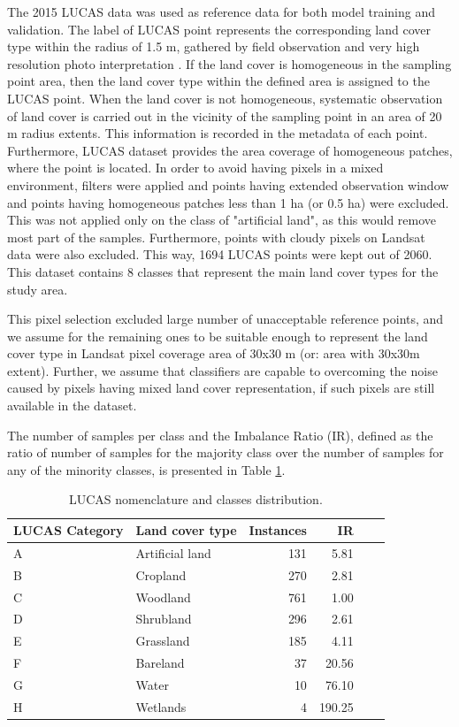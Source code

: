 \documentclass[remotesensing,article,submit,moreauthors,pdftex]{Definitions/mdpi}
\begin{document}
The 2015 LUCAS data was used as reference data for both model training and
validation. The label of LUCAS point represents the corresponding land cover
type within the radius of 1.5 m, gathered  by field observation and very high
resolution photo interpretation  \cite{LUCAS2015C1}. If the land cover is 
homogeneous in the sampling point area, then the land cover type within the 
defined area is assigned to the LUCAS point. When the land cover is not 
homogeneous, systematic observation of land cover is carried out  in the
vicinity of the sampling point in an area of 20 m radius extents. This
information is recorded in the metadata of each point. Furthermore, LUCAS
dataset provides the area coverage of homogeneous patches, where the point is
located. In order to avoid having pixels in a mixed environment, filters were
applied and points having extended observation window and points having
homogeneous patches less than 1 ha (or 0.5 ha)  were excluded. This was not
applied only on the class of "artificial land", as this would remove most part
of the samples. Furthermore, points with cloudy pixels on Landsat data were also
excluded. This way, 1694 LUCAS points were kept out of 2060. This dataset
contains 8 classes that represent the main land cover types for the study area.

This pixel selection excluded large number of unacceptable reference points, and
we assume for the remaining ones to be suitable enough to represent the land
cover type in Landsat pixel coverage area of 30x30 m (or: area with 30x30m 
extent). Further, we assume that classifiers are capable to overcoming the 
noise caused by pixels having mixed land cover representation, if such pixels 
are still available in the dataset.

The number of samples per class and the Imbalance Ratio (IR), defined as the
ratio of number of samples for the majority class over the number of samples for
any of the minority classes, is presented in Table
\ref{tab:classes_distribution}.

\begin{table}[H]
	\centering
	\begin{tabular}{llrrrr}
		\toprule
		\textbf{LUCAS Category} & \textbf{Land cover type} & \textbf{Instances}
		& \textbf{IR} \\
		\hline
		A & Artificial land & 131 & 5.81 \\
		B & Cropland        & 270 & 2.81 \\
		C & Woodland        & 761 & 1.00 \\
		D & Shrubland       & 296 & 2.61 \\
		E & Grassland       & 185 & 4.11 \\
		F & Bareland        & 37  & 20.56 \\
		G & Water           & 10  & 76.10 \\
		H & Wetlands        & 4   & 190.25\\
		\bottomrule
	\end{tabular}
	\caption{\label{tab:classes_distribution}LUCAS nomenclature and classes distribution.}
\end{table}
\end{document}
